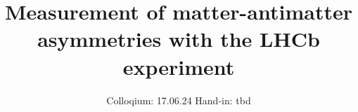 

\subject{Advanced laboratory course}
\title{Measurement of matter-antimatter asymmetries with the LHCb experiment}
\date{%
  Colloqium: 17.06.24
  \hspace{3em}
  Hand-in: tbd
}



\maketitle
\thispagestyle{empty}
\tableofcontents
\newpage






\printbibliography{}


